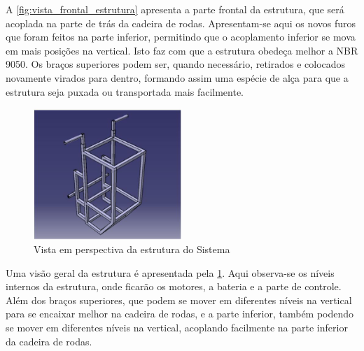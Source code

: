 A \ref{fig:vista_frontal_estrutura} apresenta a parte frontal da estrutura, que será acoplada na parte de trás da cadeira de rodas. Apresentam-se aqui os novos furos que foram feitos na parte inferior, permitindo que o acoplamento inferior se mova em mais posições na vertical. Isto faz com que a estrutura obedeça melhor a NBR 9050. Os braços superiores podem ser, quando necessário, retirados e colocados novamente virados para dentro, formando assim uma espécie de alça para que a estrutura seja puxada ou transportada mais facilmente.

\begin{figure}[!htb]
\centering
\includegraphics[width=0.5\textwidth]{figuras/resultados/vista_perspectiva_estrutura}
\caption{Vista em perspectiva da estrutura do Sistema}
\label{fig:vista_perspectiva_estrutura}
\end{figure}

Uma visão geral da estrutura é apresentada pela \ref{fig:vista_perspectiva_estrutura}. Aqui observa-se os níveis internos da estrutura, onde ficarão os motores, a bateria e a parte de controle. Além dos braços superiores, que podem se mover em diferentes níveis na vertical para se encaixar melhor na cadeira de rodas, e a parte inferior, também podendo se mover em diferentes níveis na vertical, acoplando facilmente na parte inferior da cadeira de rodas.

